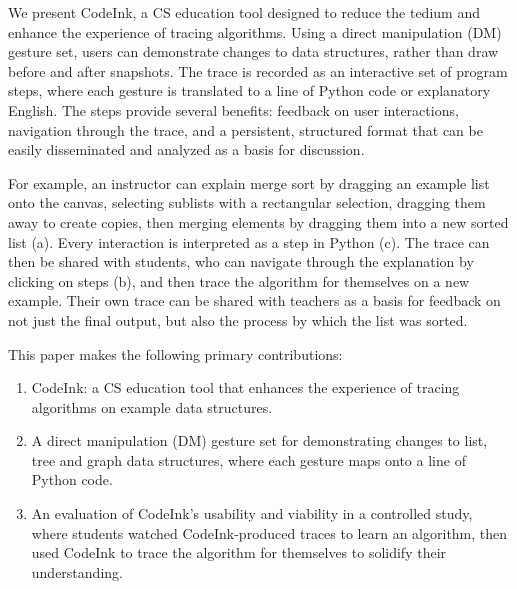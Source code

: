 We present CodeInk, a CS education tool designed to reduce the tedium and
enhance the experience of tracing algorithms. Using a direct manipulation (DM)
gesture set, users can demonstrate changes to data structures, rather than draw
before and after snapshots. The trace is recorded as an interactive set of
program steps, where each gesture is translated to a line of Python code or
explanatory English. The steps provide several benefits: feedback on user
interactions, navigation through the trace, and a persistent, structured format
that can be easily disseminated and analyzed as a basis for discussion.

For example, an instructor can explain merge sort by dragging an example list
onto the canvas, selecting sublists with a rectangular selection, dragging them
away to create copies, then merging elements by dragging them into a new sorted
list (a). Every interaction is interpreted as a step in
Python (c). The trace can then be shared with students,
who can navigate through the explanation by clicking on steps
(b), and then trace the algorithm for themselves on a new
example. Their own trace can be shared with teachers as a basis for feedback on
not just the final output, but also the process by which the list was sorted.


This paper makes the following primary contributions:

\begin{enumerate} %

\item CodeInk: a CS education tool that enhances the experience of tracing
algorithms on example data structures.
\item A direct manipulation (DM) gesture set for demonstrating changes to list,
tree and graph data structures, where each gesture maps onto a line of Python
code.
\item An evaluation of CodeInk's usability and viability in a controlled study,
where students watched CodeInk-produced traces to learn an algorithm, then used
CodeInk to trace the algorithm for themselves to solidify their
understanding.

\end{enumerate}

